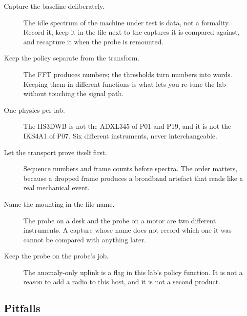 \begin{description}
\item[Capture the baseline deliberately.] The idle spectrum of the machine under test is data, not a formality. Record it, keep it in the file next to the captures it is compared against, and recapture it when the probe is remounted.
\item[Keep the policy separate from the transform.] The FFT produces numbers; the thresholds turn numbers into words. Keeping them in different functions is what lets you re-tune the lab without touching the signal path.
\item[One physics per lab.] The IIS3DWB is not the ADXL345 of P01 and P19, and it is not the IKS4A1 of P07. Six different instruments, never interchangeable.
\item[Let the transport prove itself first.] Sequence numbers and frame counts before spectra. The order matters, because a dropped frame produces a broadband artefact that reads like a real mechanical event.
\item[Name the mounting in the file name.] The probe on a desk and the probe on a motor are two different instruments. A capture whose name does not record which one it was cannot be compared with anything later.
\item[Keep the probe on the probe's job.] The anomaly-only uplink is a flag in this lab's policy function. It is not a reason to add a radio to this host, and it is not a second product.
\end{description}

\subsection*{Pitfalls}


